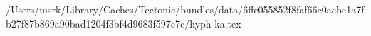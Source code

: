 /Users/msrk/Library/Caches/Tectonic/bundles/data/6ffe055852f8faf66c0acbe1a7fb27f87b869a90bad1204f3bf4d9683f597c7c/hyph-ka.tex
